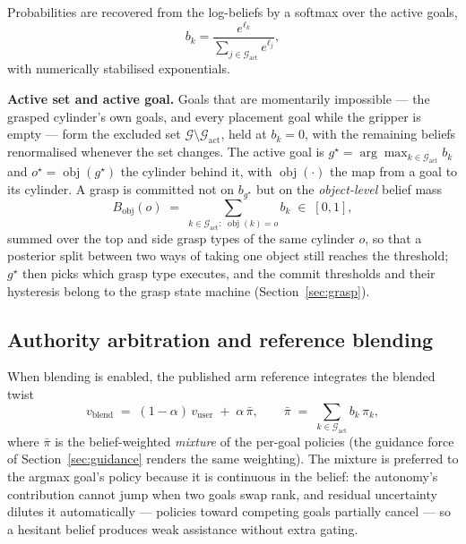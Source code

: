 \documentclass[12pt,a4paper,twoside,openright]{report}
\begin{document}
Probabilities are recovered from the log-beliefs by a softmax over the active goals,
\begin{equation}
b_k = \frac{e^{\ell_k}}{\sum_{j \in \mathcal{G}_{\text{act}}} e^{\ell_j}},
\label{eq:beliefnorm}
\end{equation}
with numerically stabilised exponentials.

\textbf{Active set and active goal.} Goals that are momentarily impossible --- the grasped cylinder's own goals, and every placement goal while the gripper is empty --- form the excluded set $\mathcal{G} \setminus \mathcal{G}_{\text{act}}$, held at $b_k = 0$, with the remaining beliefs renormalised whenever the set changes. The active goal is $g^{\star} = \arg\max_{k \in \mathcal{G}_{\text{act}}} b_k$ and $o^{\star} = \operatorname{obj}(g^{\star})$ the cylinder behind it, with $\operatorname{obj}(\cdot)$ the map from a goal to its cylinder. A grasp is committed not on $b_{g^{\star}}$ but on the \emph{object-level} belief mass
\begin{equation}
B_{\text{obj}}(o) \;=\; \sum_{k \in \mathcal{G}_{\text{act}}:\; \operatorname{obj}(k) = o} b_k \;\in\; [0,1],
\label{eq:objbelief}
\end{equation}
summed over the top and side grasp types of the same cylinder $o$, so that a posterior split between two ways of taking one object still reaches the threshold; $g^{\star}$ then picks which grasp type executes, and the commit thresholds and their hysteresis belong to the grasp state machine (Section~\ref{sec:grasp}).

\subsection{Authority arbitration and reference blending}
\label{sec:blend}

When blending is enabled, the published arm reference integrates the blended twist~\cite{dragan2013policy}
\begin{equation}
v_{\text{blend}} \;=\; (1-\alpha)\,v_{\text{user}} \;+\; \alpha\,\bar{\pi},
\qquad
\bar{\pi} \;=\; \sum_{k \in \mathcal{G}_{\text{act}}} b_k\,\pi_k,
\label{eq:blend}
\end{equation}
where $\bar{\pi}$ is the belief-weighted \emph{mixture} of the per-goal policies (the guidance force of Section~\ref{sec:guidance} renders the same weighting). The mixture is preferred to the argmax goal's policy because it is continuous in the belief: the autonomy's contribution cannot jump when two goals swap rank, and residual uncertainty dilutes it automatically --- policies toward competing goals partially cancel --- so a hesitant belief produces weak assistance without extra gating.
\end{document}
